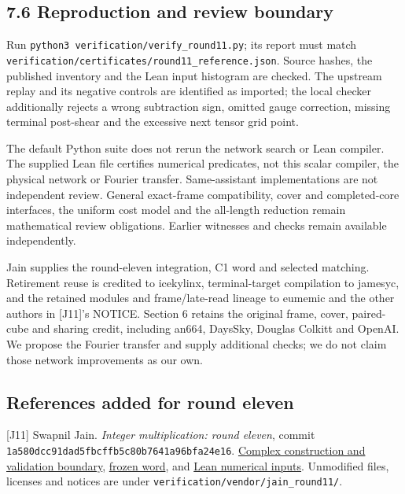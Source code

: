 \documentclass[
  11pt,
]{article}
\begin{document}
\subsection{7.6 Reproduction and review
boundary}\label{reproduction-and-review-boundary}

Run \texttt{python3\ verification/\allowbreak{}verify\_\allowbreak{}round11.py}; its report must
match \texttt{verification/\allowbreak{}certificates/\allowbreak{}round11\_\allowbreak{}reference.json}. Source
hashes, the published inventory and the Lean input histogram are
checked. The upstream replay and its negative controls are identified as
imported; the local checker additionally rejects a wrong subtraction
sign, omitted gauge correction, missing terminal post-shear and the
excessive next tensor grid point.

The default Python suite does not rerun the network search or Lean
compiler. The supplied Lean file certifies numerical predicates, not
this scalar compiler, the physical network or Fourier transfer.
Same-assistant implementations are not independent review. General
exact-frame compatibility, cover and completed-core interfaces, the
uniform cost model and the all-length reduction remain mathematical
review obligations. Earlier witnesses and checks remain available
independently.

Jain supplies the round-eleven integration, C1 word and selected
matching. Retirement reuse is credited to icekylinx, terminal-target
compilation to jamesyc, and the retained modules and frame/late-read
lineage to eumemic and the other authors in {[}J11{]}'s NOTICE. Section
6 retains the original frame, cover, paired-cube and sharing credit,
including an664, DaysSky, Douglas Colkitt and OpenAI. We propose the
Fourier transfer and supply additional checks; we do not claim those
network improvements as our own.

\subsection{References added for round
eleven}\label{references-added-for-round-eleven}

{[}J11{]} Swapnil Jain. \emph{Integer multiplication: round eleven},
commit \texttt{1a580dcc91\allowbreak{}dad5fbcffb\allowbreak{}5c80b7641a\allowbreak{}96bfa24e16}.
\href{https://github.com/Swapnil-jain/integer-mult-kappa/blob/1a580dcc91dad5fbcffb5c80b7641a96bfa24e16/independent/round11-cx-recycle-gate/README.md}{Complex
construction and validation boundary},
\href{https://github.com/Swapnil-jain/integer-mult-kappa/blob/1a580dcc91dad5fbcffb5c80b7641a96bfa24e16/certificates/round11/cx_recycle_word_p11.json.gz}{frozen
word}, and
\href{https://github.com/Swapnil-jain/integer-mult-kappa/blob/1a580dcc91dad5fbcffb5c80b7641a96bfa24e16/lean/round11-histograms.json}{Lean
numerical inputs}. Unmodified files, licenses and notices are under
\texttt{verification/\allowbreak{}vendor/\allowbreak{}jain\_\allowbreak{}round11/\allowbreak{}}.
\end{document}
